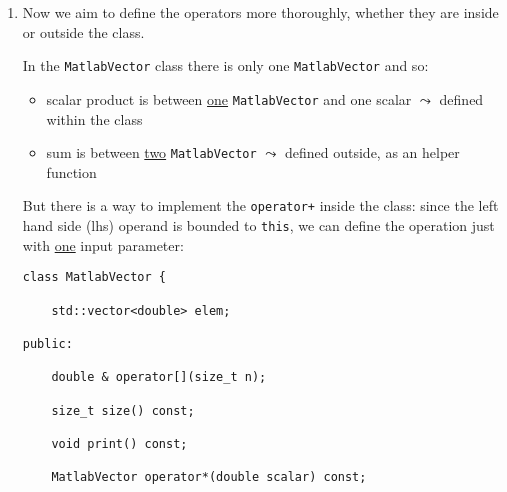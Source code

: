 \begin{enumerate}[$\triangleright$]
\begin{lstlisting}
// 3: ordered vector
MatlabVector v0;
cout << "v0 content: [ ";
for (unsigned i=0; i<10; ++i) { // Not ugly anymore!
    v0[i] = i;
    cout << v0[i] << " ";
}
cout << "]\n\n";

// 4: commutative product
MatlabVector v1 = v0*3;
cout << "v1 content: [ ";
v1.print();
cout << "]\n\n";

MatlabVector v2 = 3*v0;
cout << "v2 content: [ ";
v2.print();
cout << "]\n\n";
\end{lstlisting}

\begin{lstlisting}[frame=none]
// 1: create
v content: [ 1 3 0 4 ]

// 2: extract and automatic growth
d1 = v[6] = 0
v content after gettin d1: [ 1 3 0 4 0 0 0 ]

// 3: ordered vector
v0 content: [ 0 1 2 3 4 5 6 7 8 9 ]

// 4: commutative product
v1 content: [ 0 3 6 9 12 15 18 21 24 27 ]
v2 content: [ 0 3 6 9 12 15 18 21 24 27 ]
\end{lstlisting}

\item Now we aim to define the operators more thoroughly, whether they are inside or outside the class.

In the \texttt{MatlabVector} class there is only one \texttt{MatlabVector} and so:
\begin{itemize}
    \item scalar product is between \underline{one} \texttt{MatlabVector} and one scalar $\leadsto$ defined within the class
    \item sum is between \underline{two} \texttt{MatlabVector} $\leadsto$ defined outside, as an helper function
\end{itemize}

But there is a way to implement the \texttt{operator+} inside the class: since the left hand side (lhs) operand is bounded to \texttt{this}, we can define the operation just with \underline{one} input parameter:
\begin{lstlisting}
class MatlabVector {

    std::vector<double> elem;

public:

    double & operator[](size_t n);

    size_t size() const;

    void print() const;

    MatlabVector operator*(double scalar) const;


\end{lstlisting}
\end{enumerate}
